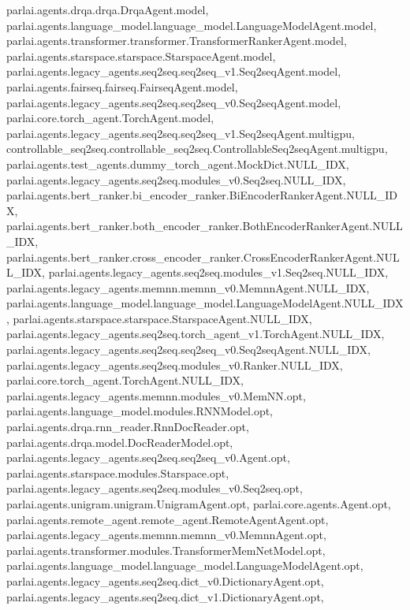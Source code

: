 parlai.\+agents.\+drqa.\+drqa.\+Drqa\+Agent.\+model, parlai.\+agents.\+language\+\_\+model.\+language\+\_\+model.\+Language\+Model\+Agent.\+model, parlai.\+agents.\+transformer.\+transformer.\+Transformer\+Ranker\+Agent.\+model, parlai.\+agents.\+starspace.\+starspace.\+Starspace\+Agent.\+model, parlai.\+agents.\+legacy\+\_\+agents.\+seq2seq.\+seq2seq\+\_\+v1.\+Seq2seq\+Agent.\+model, parlai.\+agents.\+fairseq.\+fairseq.\+Fairseq\+Agent.\+model, parlai.\+agents.\+legacy\+\_\+agents.\+seq2seq.\+seq2seq\+\_\+v0.\+Seq2seq\+Agent.\+model, parlai.\+core.\+torch\+\_\+agent.\+Torch\+Agent.\+model, parlai.\+agents.\+legacy\+\_\+agents.\+seq2seq.\+seq2seq\+\_\+v1.\+Seq2seq\+Agent.\+multigpu, controllable\+\_\+seq2seq.\+controllable\+\_\+seq2seq.\+Controllable\+Seq2seq\+Agent.\+multigpu, parlai.\+agents.\+test\+\_\+agents.\+dummy\+\_\+torch\+\_\+agent.\+Mock\+Dict.\+N\+U\+L\+L\+\_\+\+I\+DX, parlai.\+agents.\+legacy\+\_\+agents.\+seq2seq.\+modules\+\_\+v0.\+Seq2seq.\+N\+U\+L\+L\+\_\+\+I\+DX, parlai.\+agents.\+bert\+\_\+ranker.\+bi\+\_\+encoder\+\_\+ranker.\+Bi\+Encoder\+Ranker\+Agent.\+N\+U\+L\+L\+\_\+\+I\+DX, parlai.\+agents.\+bert\+\_\+ranker.\+both\+\_\+encoder\+\_\+ranker.\+Both\+Encoder\+Ranker\+Agent.\+N\+U\+L\+L\+\_\+\+I\+DX, parlai.\+agents.\+bert\+\_\+ranker.\+cross\+\_\+encoder\+\_\+ranker.\+Cross\+Encoder\+Ranker\+Agent.\+N\+U\+L\+L\+\_\+\+I\+DX, parlai.\+agents.\+legacy\+\_\+agents.\+seq2seq.\+modules\+\_\+v1.\+Seq2seq.\+N\+U\+L\+L\+\_\+\+I\+DX, parlai.\+agents.\+legacy\+\_\+agents.\+memnn.\+memnn\+\_\+v0.\+Memnn\+Agent.\+N\+U\+L\+L\+\_\+\+I\+DX, parlai.\+agents.\+language\+\_\+model.\+language\+\_\+model.\+Language\+Model\+Agent.\+N\+U\+L\+L\+\_\+\+I\+DX, parlai.\+agents.\+starspace.\+starspace.\+Starspace\+Agent.\+N\+U\+L\+L\+\_\+\+I\+DX, parlai.\+agents.\+legacy\+\_\+agents.\+seq2seq.\+torch\+\_\+agent\+\_\+v1.\+Torch\+Agent.\+N\+U\+L\+L\+\_\+\+I\+DX, parlai.\+agents.\+legacy\+\_\+agents.\+seq2seq.\+seq2seq\+\_\+v0.\+Seq2seq\+Agent.\+N\+U\+L\+L\+\_\+\+I\+DX, parlai.\+agents.\+legacy\+\_\+agents.\+seq2seq.\+modules\+\_\+v0.\+Ranker.\+N\+U\+L\+L\+\_\+\+I\+DX, parlai.\+core.\+torch\+\_\+agent.\+Torch\+Agent.\+N\+U\+L\+L\+\_\+\+I\+DX, parlai.\+agents.\+legacy\+\_\+agents.\+memnn.\+modules\+\_\+v0.\+Mem\+N\+N.\+opt, parlai.\+agents.\+language\+\_\+model.\+modules.\+R\+N\+N\+Model.\+opt, parlai.\+agents.\+drqa.\+rnn\+\_\+reader.\+Rnn\+Doc\+Reader.\+opt, parlai.\+agents.\+drqa.\+model.\+Doc\+Reader\+Model.\+opt, parlai.\+agents.\+legacy\+\_\+agents.\+seq2seq.\+seq2seq\+\_\+v0.\+Agent.\+opt, parlai.\+agents.\+starspace.\+modules.\+Starspace.\+opt, parlai.\+agents.\+legacy\+\_\+agents.\+seq2seq.\+modules\+\_\+v0.\+Seq2seq.\+opt, parlai.\+agents.\+unigram.\+unigram.\+Unigram\+Agent.\+opt, parlai.\+core.\+agents.\+Agent.\+opt, parlai.\+agents.\+remote\+\_\+agent.\+remote\+\_\+agent.\+Remote\+Agent\+Agent.\+opt, parlai.\+agents.\+legacy\+\_\+agents.\+memnn.\+memnn\+\_\+v0.\+Memnn\+Agent.\+opt, parlai.\+agents.\+transformer.\+modules.\+Transformer\+Mem\+Net\+Model.\+opt, parlai.\+agents.\+language\+\_\+model.\+language\+\_\+model.\+Language\+Model\+Agent.\+opt, parlai.\+agents.\+legacy\+\_\+agents.\+seq2seq.\+dict\+\_\+v0.\+Dictionary\+Agent.\+opt, parlai.\+agents.\+legacy\+\_\+agents.\+seq2seq.\+dict\+\_\+v1.\+Dictionary\+Agent.\+opt, 